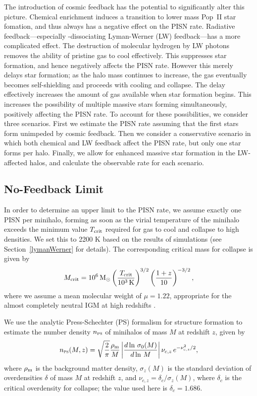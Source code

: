 \documentclass{thesis}
\newcommand{\msun}{\ensuremath{\,\mathrm{M}_{\odot}}\xspace}
\newcommand{\RefSec}[1]{\mbox{Section~\ref{#1}}}
\begin{document}
The introduction of cosmic feedback has the potential to significantly
alter this picture.  Chemical enrichment induces a transition to lower
mass Pop~II star fomation, and thus always has a negative effect on
the PISN rate.  Radiative feedback---especially \hh-dissociating
Lyman-Werner (LW) feedback---has a more complicated effect.  The
destruction of molecular hydrogen by LW photons removes the ability of
pristine gas to cool effectively. This suppresses star formation, and
hence negatively affects the PISN rate.  However this merely delays
star formation; as the halo mass continues to increase, the gas
eventually becomes self-shielding and proceeds with cooling and
collapse.  The delay effectively increases the amount of gas available
when star formation begins. This increases the possibility of multiple
massive stars forming simultaneously, positively affecting the PISN
rate.  To account for these possibilities, we consider three
scenarios.  First we estimate the PISN rate assuming that the first
stars form unimpeded by cosmic feedback. Then we consider a
conservative scenario in which both chemical and LW feedback affect
the PISN rate, but only one star forms per halo.  Finally, we allow
for enhanced massive star formation in the LW-affected halos, and calculate
the observable rate for each scenario.


\subsection{No-Feedback Limit}
In order to determine an upper limit to the PISN rate, we assume
exactly one PISN per minihalo, forming as soon as the virial
temperature of the minihalo exceeds the minimum value $T_{\rm crit}$
required for gas to cool and collapse to high densities. We set this
to 2200 K based on the results of simulations (see
\RefSec{lymanWerner} for details).  The corresponding critical mass
for collapse is given by
\begin{equation}
  \label{mcriteq}
    M_{\rm crit} = 10^6\msun
    \left( \frac{T_{\rm crit}}{10^3 \,{\rm K}}\right)^{3/2} 
   \left( \frac{1+z}{10}\right)^{-3/2},
\end{equation}
where we assume a mean molecular weight of $\mu=1.22$, appropriate for
the almost completely neutral IGM at high redshifts
\citep{BarkanaLoeb2001}.

We use the analytic Press-Schechter (PS) formalism for structure
formation \citep{PressSchechter1974} to estimate the number density
$n_{\textsc{ps}}$ of minihalos of mass $M$ at redshift $z$, given by
\begin{equation}
n_{\textsc{ps}} (M,z) = \sqrt{\frac{2}{\pi}}
\frac{\rho_{\rm m}}{M}\left|\frac{d\ln \,\sigma_{0}(M)}{d\ln \,M}
\right|\nu_{c,z} \,e^{-\nu_{c,z}^2 /2},
\end{equation}
where $\rho_{\rm m}$ is the background matter density, $\sigma_{z}(M)$
is the standard deviation of overdensities $\delta$ of mass $M$ at
redshift $z$, and $\nu_{c,z} = \delta_c / \sigma_{z}(M)$, where
$\delta_c$ is the critical overdensity for collapse; the value used
here is $\delta_c =1.686$.
\end{document}
